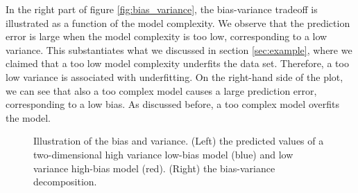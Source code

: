 In the right part of figure \eqref{fig:bias_variance}, the bias-variance tradeoff is illustrated as a function of the model complexity. We observe that the prediction error is large when the model complexity is too low, corresponding to a low variance. This substantiates what we discussed in section \ref{sec:example}, where we claimed that a too low model complexity underfits the data set. Therefore, a too low variance is associated with underfitting. On the right-hand side of the plot, we can see that also a too complex model causes a large prediction error, corresponding to a low bias. As discussed before, a too complex model overfits the model. 

\begin{figure}
	\centering
	
	\caption{Illustration of the bias and variance. (Left) the predicted values of a two-dimensional high variance low-bias model (blue) and low variance high-bias model (red). (Right) the bias-variance decomposition.}
	\label{fig:bias_variance}
\end{figure}

